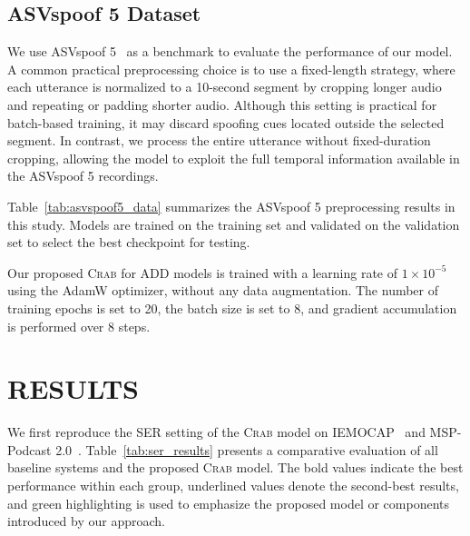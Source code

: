 \documentclass[12pt, a4paper, twocolumn]{article}
\newcommand{\crab}{\textsc{Crab}}
\begin{document}
\subsection{ASVspoof 5 Dataset}
We use ASVspoof 5~\cite{wang2025asvspoof5designcollection} as a benchmark to evaluate the performance of our model.
A common practical preprocessing choice is to use a fixed-length strategy,
where each utterance is normalized to a 10-second segment by cropping longer audio and repeating or padding shorter audio.
Although this setting is practical for batch-based training, it may discard spoofing cues located outside the selected segment. 
In contrast, we process the entire utterance without fixed-duration cropping, allowing the model to exploit the full temporal information available in the ASVspoof 5 recordings.

Table~\ref{tab:asvspoof5_data} summarizes the ASVspoof 5 preprocessing results in this study.
 Models are trained on the training set and validated on the validation set to select the best checkpoint for testing.

Our proposed \crab{} for ADD models is trained with a learning rate of \(1 \times 10^{-5}\) using the AdamW optimizer,
without any data augmentation. The number of training epochs is set to 20, the batch size is set to 8,
and gradient accumulation is performed over 8 steps.



\section{RESULTS}
We first reproduce the SER setting of the \crab{} model on IEMOCAP~\cite{busso2008iemocap} and MSP-Podcast 2.0~\cite{busso2025msppodcast}.
Table~\ref{tab:ser_results} presents a comparative evaluation of all baseline systems and the proposed \crab{} model.
The bold values indicate the best performance within each group,
 underlined values denote the second-best results,
  and green highlighting is used to emphasize the proposed model or components introduced by our approach.
\end{document}
